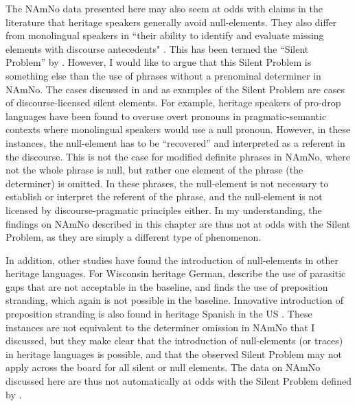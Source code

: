 \documentclass[output=paper]{langscibook}
\begin{document}
The NAmNo data presented here may also seem at odds with claims in the literature that heritage speakers generally avoid null\hyp elements. They also differ from monolingual speakers in ``their ability to identify and evaluate missing elements with discourse antecedents" \citep[136]{LalekoPolinsky2017}. This has been termed the ``Silent Problem'' by \citet{LalekoPolinsky2017}. However, I would like to argue that this Silent Problem is something else than the use of phrases without a prenominal determiner in NAmNo. The cases discussed in \citet{LalekoPolinsky2017} and \citet{Polinsky2018} as examples of the Silent Problem are cases of discourse-licensed silent elements. For example, heritage speakers of pro-drop languages have been found to overuse overt pronouns in pragmatic\hyp semantic contexts where monolingual speakers would use a null pronoun. However, in these instances, the null\hyp element has to be “recovered” and interpreted as a referent in the discourse. This is not the case for modified definite phrases in NAmNo, where not the whole phrase is null, but rather one element of the phrase (the determiner) is omitted. In these phrases, the null\hyp element is not necessary to establish or interpret the referent of the phrase, and the null\hyp element is not licensed by discourse\hyp pragmatic principles either. In my understanding, the findings on NAmNo described in this chapter are thus not at odds with the Silent Problem, as they are simply a different type of phenomenon.
 
In addition, other studies have found the introduction of null\hyp elements in other heritage languages. For Wisconsin heritage German, \citet{BousquetteEtAl2016} describe the use of parasitic gaps that are not acceptable in the baseline, and \citet{Bousquette2018} finds the use of preposition stranding, which again is not possible in the baseline. Innovative introduction of preposition stranding is also found in heritage Spanish in the US \citep{PascualyCabo2015}. These instances are not equivalent to the determiner omission in NAmNo that I discussed, but they make clear that the introduction of null\hyp elements (or traces) in heritage languages is possible, and that the observed Silent Problem may not apply across the board for all silent or null elements. The data on NAmNo discussed here are thus not automatically at odds with the Silent Problem defined by \citet{LalekoPolinsky2017}.
 
\end{document}
